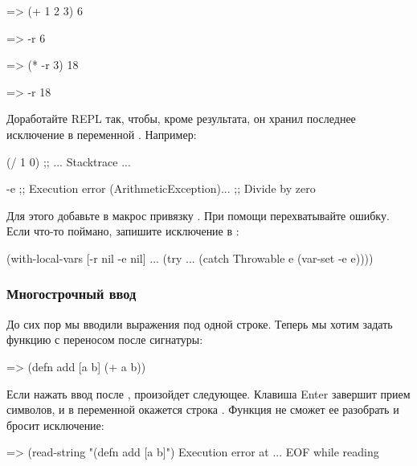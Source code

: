 \begin{english}
  \begin{clojure}
=> (+ 1 2 3)
6

=> -r
6

=> (* -r 3)
18

=> -r
18
  \end{clojure}
\end{english}

Доработайте REPL так, чтобы, кроме результата, он хранил последнее исключение в переменной . Например:

\begin{english}
  \begin{clojure}
(/ 1 0)
;; ... Stacktrace ...

-e
;; Execution error (ArithmeticException)...
;; Divide by zero
  \end{clojure}
\end{english}

Для этого добавьте в макрос  привязку \code{[... -e nil]}. При помощи  перехватывайте ошибку. Если что-то поймано, запишите исключение в :

\begin{english}
  \begin{clojure}
(with-local-vars [-r nil -e nil]
  ...
  (try
    ...
    (catch Throwable e
      (var-set -e e))))
  \end{clojure}
\end{english}

\subsubsection{Многострочный ввод}

До сих пор мы вводили выражения под одной строке. Теперь мы хотим задать функцию с переносом после сигнатуры:

\begin{english}
  \begin{clojure}
=> (defn add [a b]
    (+ a b))
  \end{clojure}
\end{english}

Если нажать ввод после \code{b]}, произойдет следующее. Клавиша Enter завершит прием символов, и в переменной окажется строка . Функция  не сможет ее разобрать и бросит исключение:

\begin{english}
  \begin{clojure}
=> (read-string "(defn add [a b]")
Execution error at ...
EOF while reading
  \end{clojure}
\end{english}

